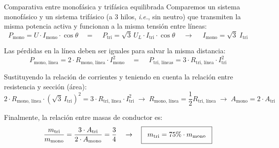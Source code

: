 \documentclass[aspectratio=169, usenames,svgnames,dvipsnames]{beamer}
\begin{document}
\begin{frame}{Comparativa entre monofásica y trifásica equilibrada}
    \vspace{3mm}
    Comparemos un sistema monofásico y un sistema trifásico (a 3 hilos, \textit{i.e.}, sin neutro) que transmiten la \alert{misma potencia activa} y funcionan a la \alert{misma tensión entre líneas}:
    \[
        P_{\textrm{mono}} = U \cdot I_{\textrm{mono}} \cdot \cos\theta  
        \quad = \quad\, 
        P_{\textrm{tri}} = \sqrt{3} \, U_L \cdot  I_{\textrm{tri}} \cdot \cos\theta \quad\, \rightarrow \quad\; \boxed{I_{\textrm{mono}} = \sqrt{3} \;I_{\textrm{tri}}}
    \]
    
    Las \alert{pérdidas en la línea} deben ser \alert{iguales} para salvar la \alert{misma distancia}:
    \[
      P_{\textrm{mono, línea}} = 2\cdot R_{\textrm{mono, línea}}\cdot I_{\textrm{mono}}^2 
      \quad = \quad\, 
      P_{\textrm{tri, líneas}} = 3\cdot R_{\textrm{tri, línea}}\cdot I_{\textrm{tri}}^2
    \]
    
    Sustituyendo la relación de corrientes y teniendo en cuenta la relación entre resistencia y sección (área):
    \[
      2\cdot R_{\textrm{mono, línea}} \cdot (\sqrt3\, I_{\textrm{tri}})^2 = 3\cdot R_{\textrm{tri, línea}} \cdot I_{\textrm{tri}}^2 
      \; \rightarrow \; 
      R_{\textrm{mono, línea}} = \frac{1}{2} R_{\textrm{tri, línea}} 
      \; \rightarrow \; 
      \boxed{A_{\textrm{mono}} = 2 \cdot A_{\textrm{tri}}}
    \]
    
    Finalmente, la \alert{relación} entre \alert{masas de conductor} es:    
    \[
      \frac{m_{\textrm{tri}}}{m_{\textrm{mono}}} = \frac{3 \cdot A_{\textrm{tri}}}{2 \cdot A_{\textrm{mono}}} = \frac{3}{4}
      \quad \rightarrow \quad 
      \boxed{ \;\; \vphantom{\frac{a}{a}} m_{\textrm{tri}} = 75\% \cdot m_{\textrm{mono}} \;\; }
    \]
\end{frame}

\end{document}
